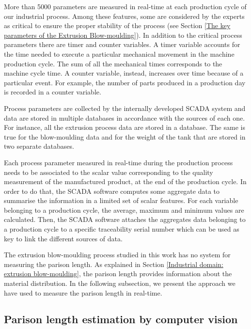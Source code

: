 More than 5000 parameters are measured in real-time at each production cycle of our industrial process. Among these features, some are considered by the experts as critical to ensure the proper stability of the process (see Section \ref{The key parameters of the Extrusion Blow-moulding}). In addition to the critical process parameters there are timer and counter variables. A timer variable accounts for the time needed to execute a particular mechanical movement in the machine production cycle. The sum of all the mechanical times corresponds to the machine cycle time. A counter variable, instead, increases over time because of a particular event. For example, the number of parts produced in a production day is recorded in a counter variable.  

Process parameters are collected by the internally developed SCADA system and data are stored in multiple databases in accordance with the sources of each one. For instance, all the extrusion process data are stored in a database. The same is true for the blow-moulding data and for the weight of the tank that are stored in two separate databases. 

Each process parameter measured in real-time during the production process needs to be associated to the scalar value corresponding to the quality measurement of the manufactured product, at the end of the production cycle. In order to do that, the SCADA software computes some aggregate data to summarise the information in a limited set of scalar features. For each variable belonging to a production cycle, the average, maximum and minimum values are calculated. Then, the SCADA software attaches the aggregates data belonging to a production cycle to a specific traceability serial number which can be used as key to link the different sources of data. 

The extrusion blow-moulding process studied in this work has no system for measuring the parison length. As explained in Section \ref{Industrial domain: extrusion blow-moulding}, the parison length provides information about the material distribution. In the following subsection, we present the approach we have used to measure the parison length in real-time.

\subsection{Parison length estimation by computer vision}

